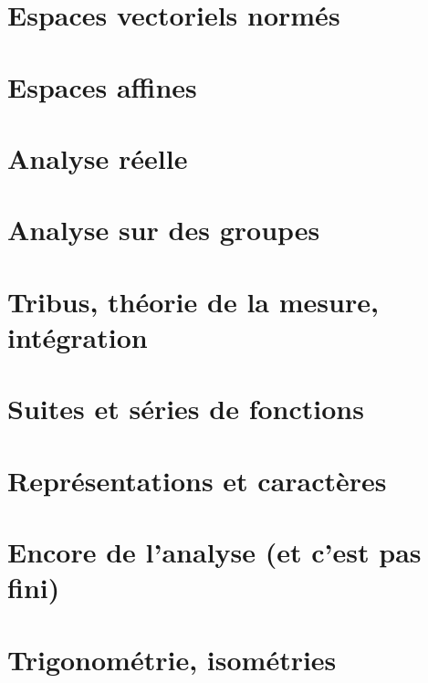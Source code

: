 \documentclass[a4paper,twoside,11pt]{book}
\begin{document}
\chapter{Espaces vectoriels normés}



\chapter{Espaces affines}


\chapter{Analyse réelle}








\chapter{Analyse sur des groupes}


\chapter{Tribus, théorie de la mesure, intégration}






\chapter{Suites et séries de fonctions}





\chapter{Représentations et caractères}


\chapter{Encore de l'analyse (et c'est pas fini)}





\chapter{Trigonométrie, isométries}




\end{document}
